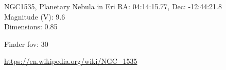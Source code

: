 \begin{block}{NGC1535, Planetary Nebula in Eri}
    RA: 04:14:15.77, Dec: -12:44:21.8 \\ 
    Magnitude (V): 9.6 \\ 
    Dimensions: 0.85 

    Finder fov: 30 

    \url{https://en.wikipedia.org/wiki/NGC_1535} 
\end{block}